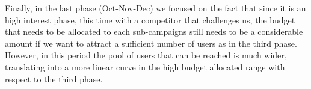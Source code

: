  \newpage
Finally, in the last phase (Oct-Nov-Dec) we focused on the fact that since it is an high interest phase, this time with a competitor that challenges us, the budget that needs to be allocated to each sub-campaigns still needs to be a considerable amount if we want to attract a sufficient number of users as in the third phase. However, in this period the pool of users that can be reached is much wider, translating into a more linear curve in the high budget allocated range with respect to the third phase.\\\\
 \\\\
